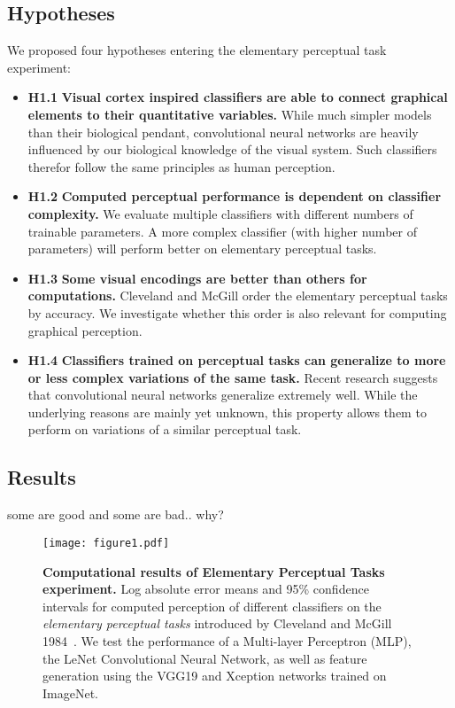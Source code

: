 \subsection{Hypotheses}

We proposed four hypotheses entering the elementary perceptual task experiment:

\begin{itemize}
	\item \textbf{H1.1} \textbf{Visual cortex inspired classifiers are able to connect graphical elements to their quantitative variables.} While much simpler models than their biological pendant, convolutional neural networks are heavily influenced by our biological knowledge of the visual system. Such classifiers therefor follow the same principles as human perception.
	\item \textbf{H1.2} \textbf{Computed perceptual performance is dependent on classifier complexity.} We evaluate multiple classifiers with different numbers of trainable parameters. A more complex classifier (with higher number of parameters) will perform better on elementary perceptual tasks.
	\item \textbf{H1.3} \textbf{Some visual encodings are better than others for computations.} Cleveland and McGill order the elementary perceptual tasks by accuracy. We investigate whether this order is also relevant for computing graphical perception.
	\item \textbf{H1.4} \textbf{Classifiers trained on perceptual tasks can generalize to more or less complex variations of the same task.} Recent research suggests that convolutional neural networks generalize extremely well. While the underlying reasons are mainly yet unknown, this property allows them to perform on variations of a similar perceptual task.
\end{itemize}

\subsection{Results}


some are good and some are bad.. why?

\begin{figure*}[h]
	\centering
	  \texttt{[image: figure1.pdf]}
  \caption{\textbf{Computational results of Elementary Perceptual Tasks experiment.} Log absolute error means and 95\% confidence intervals for computed perception of different classifiers on the \emph{elementary perceptual tasks} introduced by Cleveland and McGill 1984~\cite{cleveland_mcgill}. We test the performance of a Multi-layer Perceptron (MLP), the LeNet Convolutional Neural Network, as well as feature generation using the VGG19 and Xception networks trained on ImageNet.}
	\label{fig:figure1_results}
\end{figure*}

